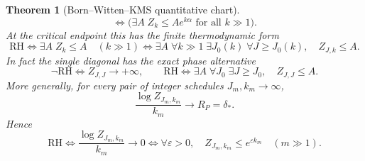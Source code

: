 \documentclass[11pt]{article}
\newtheorem{theorem}{Theorem}[section]
\begin{document}
\begin{theorem}[Born--Witten--KMS quantitative chart]
\[ \Longleftrightarrow
 \bigl(\exists A\; Z_k\le A e^{k\alpha}\text{ for all }k\gg1\bigr).
 \tag{9.22g}
\]
At the critical endpoint this has the finite thermodynamic form
\[
 \mathrm{RH}
 \Longleftrightarrow \exists A\; Z_k\le A\quad(k\gg1)
 \Longleftrightarrow
 \exists A\;\forall k\gg1\;\exists J_0(k)\;\forall J\ge J_0(k),\quad Z_{J,k}\le A.
 \tag{9.22h}
\]
In fact the single diagonal has the exact phase alternative
\[
 \neg\mathrm{RH}
 \Longleftrightarrow Z_{J,J}\longrightarrow+\infty,
 \qquad
 \mathrm{RH}
 \Longleftrightarrow
 \exists A\;\forall J_0\;\exists J\ge J_0,\quad Z_{J,J}\le A.
 \tag{9.22ha}
\]
More generally, for every pair of integer schedules $J_m,k_m\to\infty$,
\[
 \frac{\log Z_{J_m,k_m}}{k_m}\longrightarrow R_P=\delta_*.
 \tag{9.22haa}
\]
Hence
\[
 \mathrm{RH}
 \Longleftrightarrow
 \frac{\log Z_{J_m,k_m}}{k_m}\longrightarrow0
 \Longleftrightarrow
 \forall\varepsilon>0,\quad
 Z_{J_m,k_m}\le e^{\varepsilon k_m}\quad(m\gg1).
 \tag{9.22hab}
\]


\end{theorem}
\end{document}
